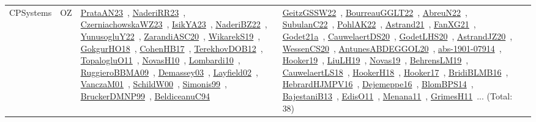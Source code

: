 {\begin{longtable}{lp{3cm}>{\raggedright\arraybackslash}p{6cm}>{\raggedright\arraybackslash}p{6cm}>{\raggedright\arraybackslash}p{8cm}}
CPSystems & OZ & \href{works/PrataAN23.pdf}{PrataAN23}~\cite{PrataAN23}, \href{works/NaderiRR23.pdf}{NaderiRR23}~\cite{NaderiRR23}, \href{works/CzerniachowskaWZ23.pdf}{CzerniachowskaWZ23}~\cite{CzerniachowskaWZ23}, \href{works/IsikYA23.pdf}{IsikYA23}~\cite{IsikYA23}, \href{works/NaderiBZ22.pdf}{NaderiBZ22}~\cite{NaderiBZ22}, \href{works/YunusogluY22.pdf}{YunusogluY22}~\cite{YunusogluY22}, \href{works/ZarandiASC20.pdf}{ZarandiASC20}~\cite{ZarandiASC20}, \href{works/WikarekS19.pdf}{WikarekS19}~\cite{WikarekS19}, \href{works/GokgurHO18.pdf}{GokgurHO18}~\cite{GokgurHO18}, \href{works/CohenHB17.pdf}{CohenHB17}~\cite{CohenHB17}, \href{works/TerekhovDOB12.pdf}{TerekhovDOB12}~\cite{TerekhovDOB12}, \href{works/TopalogluO11.pdf}{TopalogluO11}~\cite{TopalogluO11}, \href{works/NovasH10.pdf}{NovasH10}~\cite{NovasH10}, \href{works/Lombardi10.pdf}{Lombardi10}~\cite{Lombardi10}, \href{works/RuggieroBBMA09.pdf}{RuggieroBBMA09}~\cite{RuggieroBBMA09}, \href{works/Demassey03.pdf}{Demassey03}~\cite{Demassey03}, \href{works/Layfield02.pdf}{Layfield02}~\cite{Layfield02}, \href{works/VanczaM01.pdf}{VanczaM01}~\cite{VanczaM01}, \href{works/SchildW00.pdf}{SchildW00}~\cite{SchildW00}, \href{works/Simonis99.pdf}{Simonis99}~\cite{Simonis99}, \href{works/BruckerDMNP99.pdf}{BruckerDMNP99}~\cite{BruckerDMNP99}, \href{works/BeldiceanuC94.pdf}{BeldiceanuC94}~\cite{BeldiceanuC94} & \href{works/GeitzGSSW22.pdf}{GeitzGSSW22}~\cite{GeitzGSSW22}, \href{works/BourreauGGLT22.pdf}{BourreauGGLT22}~\cite{BourreauGGLT22}, \href{works/AbreuN22.pdf}{AbreuN22}~\cite{AbreuN22}, \href{works/SubulanC22.pdf}{SubulanC22}~\cite{SubulanC22}, \href{works/PohlAK22.pdf}{PohlAK22}~\cite{PohlAK22}, \href{works/Astrand21.pdf}{Astrand21}~\cite{Astrand21}, \href{works/FanXG21.pdf}{FanXG21}~\cite{FanXG21}, \href{works/Godet21a.pdf}{Godet21a}~\cite{Godet21a}, \href{works/CauwelaertDS20.pdf}{CauwelaertDS20}~\cite{CauwelaertDS20}, \href{works/GodetLHS20.pdf}{GodetLHS20}~\cite{GodetLHS20}, \href{works/AstrandJZ20.pdf}{AstrandJZ20}~\cite{AstrandJZ20}, \href{works/WessenCS20.pdf}{WessenCS20}~\cite{WessenCS20}, \href{works/AntunesABDEGGOL20.pdf}{AntunesABDEGGOL20}~\cite{AntunesABDEGGOL20}, \href{works/abs-1901-07914.pdf}{abs-1901-07914}~\cite{abs-1901-07914}, \href{works/Hooker19.pdf}{Hooker19}~\cite{Hooker19}, \href{works/LiuLH19.pdf}{LiuLH19}~\cite{LiuLH19}, \href{works/Novas19.pdf}{Novas19}~\cite{Novas19}, \href{works/BehrensLM19.pdf}{BehrensLM19}~\cite{BehrensLM19}, \href{works/CauwelaertLS18.pdf}{CauwelaertLS18}~\cite{CauwelaertLS18}, \href{works/HookerH18.pdf}{HookerH18}~\cite{HookerH18}, \href{works/Hooker17.pdf}{Hooker17}~\cite{Hooker17}, \href{works/BridiBLMB16.pdf}{BridiBLMB16}~\cite{BridiBLMB16}, \href{works/HebrardHJMPV16.pdf}{HebrardHJMPV16}~\cite{HebrardHJMPV16}, \href{works/Dejemeppe16.pdf}{Dejemeppe16}~\cite{Dejemeppe16}, \href{works/BlomBPS14.pdf}{BlomBPS14}~\cite{BlomBPS14}, \href{works/BajestaniB13.pdf}{BajestaniB13}~\cite{BajestaniB13}, \href{works/EdisO11.pdf}{EdisO11}~\cite{EdisO11}, \href{works/Menana11.pdf}{Menana11}~\cite{Menana11}, \href{works/GrimesH11.pdf}{GrimesH11}~\cite{GrimesH11}... (Total: 38) & 
\end{longtable}}
